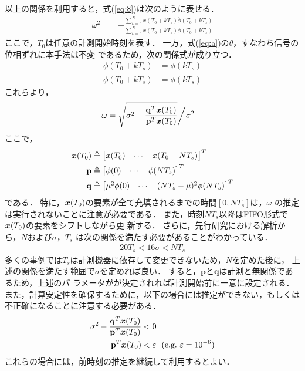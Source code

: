 \documentclass{ieej}
\def\vec#1{\mbox{\boldmath$#1$}}
\begin{document}
以上の関係を利用すると，式(\ref{eq:8})は次のように表せる．
\begin{align}
\omega^2&=-\frac{\sum^{N}_{k=0} x(T_0+kT_s)\ddot{\phi}(T_0+kT_s)}{\sum^{N}_{k=0} x(T_0+kT_s)\phi(T_0+kT_s)}
\end{align}
ここで，$T_0$は任意の計測開始時刻を表す．
一方，式(\ref{eq:a})の$\theta$，すなわち信号の位相ずれに本手法は不変
であるため，次の関係式が成り立つ．
\begin{align}
 \phi(T_0+kT_s)&=\phi(kT_s)\\
 \ddot{\phi}(T_0+kT_s)&=\ddot{\phi}(kT_s)
\end{align}
これらより，
\begin{align}
\omega 
&=\sqrt{
 \sigma^2-
 \frac{\mathbf{q}^T\vec{x}(T_0)}
 {\mathbf{p}^T\vec{x}(T_0)}
 }\biggl/\sigma^2
\end{align}
ここで，
\begin{align*}
 \vec{x}(T_0)&\triangleq 
 \left[ 
 \begin{matrix}
  x(T_0) & \cdots & x(T_0+NT_s) 
 \end{matrix}
 \right]^T\\
%
 \mathbf{p}&\triangleq 
 \left[ 
 \begin{matrix}
  \phi(0) & \cdots & \phi(NT_s) 
 \end{matrix}
 \right]^T\\
%
 \mathbf{q}&\triangleq 
 \left[ 
 \begin{matrix}
  \mu^2\phi(0)  & \cdots & (NT_s-\mu)^2\phi(NT_s) 
 \end{matrix}
 \right]^T
\end{align*}
である．
特に，$\vec{x}(T_0)$の要素が全て充填されるまでの時間$[0,NT_s]$は，$\omega$
の推定は実行されないことに注意が必要である．
また，時刻$NT_s$以降はFIFO形式で$\vec{x}(T_0)$の要素をシフトしながら更
新する．
%
さらに，先行研究における解析から，$N$および$\sigma$，$T_s$
は次の関係を満たす必要があることがわかっている．
\begin{align}
 20T_s <16\sigma < NT_s
\end{align}
多くの事例では$T_s$は計測機器に依存して変更できないため，$N$を定めた後に，
上述の関係を満たす範囲で$\sigma$を定めれば良い．
すると，$\mathbf{p}$と$\mathbf{q}$は計測と無関係であるため，上述のパ
ラメータがが決定されれば計測開始前に一意に設定される．
%
また，計算安定性を確保するために，以下の場合には推定ができない，もしくは
不正確になることに注意する必要がある．
\begin{align}
 \sigma^2-\frac{\mathbf{q}^T\vec{x}(T_0)}{\mathbf{p}^T\vec{x}(T_0)} &<0\\
 \mathbf{p}^T\vec{x}(T_0)&<\varepsilon \ \ (\mbox{e.g.}\  \varepsilon=10^{-6})
\end{align}
これらの場合には，前時刻の推定を継続して利用するとよい．
\end{document}
